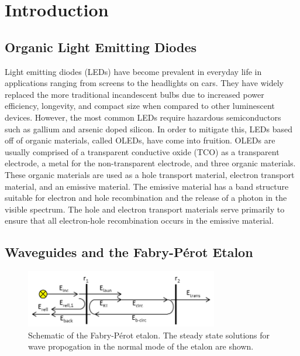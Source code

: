\documentclass{report}
\begin{document}
\tableofcontents

\chapter{Introduction} \label{intro}

    \section{Organic Light Emitting Diodes}
        Light emitting diodes (LEDs) have become prevalent in everyday life in applications ranging from screens to the headlights on cars. They have widely replaced the more traditional incandescent bulbs due to increased power efficiency, longevity, and compact size when compared to other luminescent devices. However, the most common LEDs require hazardous semiconductors such as gallium and arsenic doped silicon\cite{Lim2011}. In order to mitigate this, LEDs based off of organic materials, called OLEDs, have come into fruition. OLEDs are usually comprised of a transparent conductive oxide (TCO) as a transparent electrode, a metal for the non-transparent electrode, and three organic materials. These organic materials are used as a hole transport material, electron transport material, and an emissive material. The emissive material has a band structure suitable for electron and hole recombination and the release of a photon in the visible spectrum. The hole and electron transport materials serve primarily to ensure that all electron-hole recombination occurs in the emissive material.
        
    \section{Waveguides and the Fabry-P\'erot Etalon}
        \begin{figure}
            \centering
            \includegraphics[width=0.75\textwidth]{images/etalon_schematic.png}
            \caption{Schematic of the Fabry-P\'erot etalon. The steady state solutions for wave propogation in the normal mode of the etalon are shown\cite{Ismail2016}.}
            \label{fig:etalon}
        \end{figure}
\end{document}
